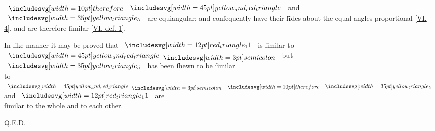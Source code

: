 \documentclass[12pt,preview]{standalone}
\begin{document}
\begin{minipage}[t]{0.64\textwidth}
    \hfill

    \hfill

    $\btherefore \img[0][0][45]{yellow_and_red_triangle}$ and $\img[0][0][35]{yellow_triangle_5}$ are equiangular; and conſequently have their ſides about the equal angles proportional [\hyperref[book6pr4]{\textsc{VI.} 4}], and are therefore ſimilar [\hyperref[book6def1]{\textsc{VI.} def. 1}].

    \hfill

    \begin{center}
        In like manner it may be proved that $\img[0][0][12]{red_triangle_11}$ is ſimilar to\\
        $\img[0][0][45]{yellow_and_red_triangle} \bsemicolon$ but $\img[0][0][35]{yellow_triangle_5}$ has been ſhewn to be ſimilar\\
        to $\img[0][0][45]{yellow_and_red_triangle} \bsemicolon \btherefore \img[0][0][35]{yellow_triangle_5}$ and $\img[0][0][12]{red_triangle_11}$ are\\
        ſimilar to the whole and to each other.
    \end{center}

    \hfill

    \hfill Q.E.D.
\end{minipage}
\end{document}
